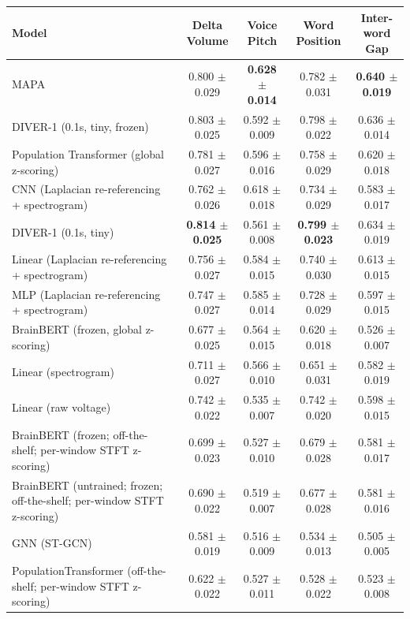 \begin{table}[!htbp]
\begin{tabular}{>{\raggedright\arraybackslash}p{8cm}cccc}
\hline
\end{tabular}
\hspace{1em}
\hspace*{-2.5cm}\begin{tabular}{>{\raggedright\arraybackslash}p{8cm}cccc}
\hline
Model & Delta Volume & Voice Pitch & Word Position & Inter-word Gap \\
\hline
MAPA & 0.800 $\pm$ 0.029 & \textbf{0.628 $\pm$ 0.014} & 0.782 $\pm$ 0.031 & \textbf{0.640 $\pm$ 0.019} \\
DIVER-1 (0.1s, tiny, frozen) & 0.803 $\pm$ 0.025 & 0.592 $\pm$ 0.009 & 0.798 $\pm$ 0.022 & 0.636 $\pm$ 0.014 \\
Population Transformer (global z-scoring) & 0.781 $\pm$ 0.027 & 0.596 $\pm$ 0.016 & 0.758 $\pm$ 0.029 & 0.620 $\pm$ 0.018 \\
CNN (Laplacian re-referencing + spectrogram) & 0.762 $\pm$ 0.026 & 0.618 $\pm$ 0.018 & 0.734 $\pm$ 0.029 & 0.583 $\pm$ 0.017 \\
DIVER-1 (0.1s, tiny) & \textbf{0.814 $\pm$ 0.025} & 0.561 $\pm$ 0.008 & \textbf{0.799 $\pm$ 0.023} & 0.634 $\pm$ 0.019 \\
Linear (Laplacian re-referencing + spectrogram) & 0.756 $\pm$ 0.027 & 0.584 $\pm$ 0.015 & 0.740 $\pm$ 0.030 & 0.613 $\pm$ 0.015 \\
MLP (Laplacian re-referencing + spectrogram) & 0.747 $\pm$ 0.027 & 0.585 $\pm$ 0.014 & 0.728 $\pm$ 0.029 & 0.597 $\pm$ 0.015 \\
BrainBERT (frozen, global z-scoring) & 0.677 $\pm$ 0.025 & 0.564 $\pm$ 0.015 & 0.620 $\pm$ 0.018 & 0.526 $\pm$ 0.007 \\
Linear (spectrogram) & 0.711 $\pm$ 0.027 & 0.566 $\pm$ 0.010 & 0.651 $\pm$ 0.031 & 0.582 $\pm$ 0.019 \\
Linear (raw voltage) & 0.742 $\pm$ 0.022 & 0.535 $\pm$ 0.007 & 0.742 $\pm$ 0.020 & 0.598 $\pm$ 0.015 \\
BrainBERT (frozen; off-the-shelf; per-window STFT z-scoring) & 0.699 $\pm$ 0.023 & 0.527 $\pm$ 0.010 & 0.679 $\pm$ 0.028 & 0.581 $\pm$ 0.017 \\
BrainBERT (untrained; frozen; off-the-shelf; per-window STFT z-scoring) & 0.690 $\pm$ 0.022 & 0.519 $\pm$ 0.007 & 0.677 $\pm$ 0.028 & 0.581 $\pm$ 0.016 \\
GNN (ST-GCN) & 0.581 $\pm$ 0.019 & 0.516 $\pm$ 0.009 & 0.534 $\pm$ 0.013 & 0.505 $\pm$ 0.005 \\
PopulationTransformer (off-the-shelf; per-window STFT z-scoring) & 0.622 $\pm$ 0.022 & 0.527 $\pm$ 0.011 & 0.528 $\pm$ 0.022 & 0.523 $\pm$ 0.008 \\

\end{tabular}
\end{table}
